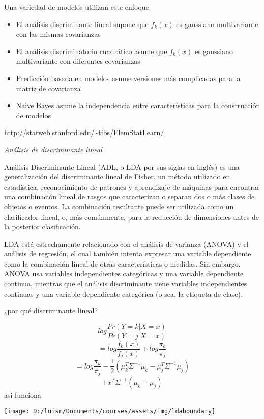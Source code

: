 \documentclass[
]{article}
\providecommand{\tightlist}{%
  \setlength{\itemsep}{0pt}\setlength{\parskip}{0pt}}
\begin{document}
Una variedad de modelos utilizan este enfoque

\begin{itemize}
\tightlist
\item
  El análisis discriminante lineal supone que \(f_k (x)\) es gaussiano
  multivariante con las mismas covarianzas
\item
  El análisis discriminatorio cuadrático asume que \(f_k (x)\) es
  gaussiano multivariante con diferentes covarianzas
\item
  \href{http://www.stat.washington.edu/mclust/}{Predicción basada en
  modelos} asume versiones más complicadas para la matriz de covarianza
\item
  Naive Bayes asume la independencia entre características para la
  construcción de modelos
\end{itemize}

\url{http://statweb.stanford.edu/~tibs/ElemStatLearn/}

\emph{Análisis de discriminante lineal}

Análisis Discriminante Lineal (ADL, o LDA por sus siglas en inglés) es
una generalización del discriminante lineal de Fisher, un método
utilizado en estadística, reconocimiento de patrones y aprendizaje de
máquinas para encontrar una combinación lineal de rasgos que
caracterizan o separan dos o más clases de objetos o eventos. La
combinación resultante puede ser utilizada como un clasificador lineal,
o, más comúnmente, para la reducción de dimensiones antes de la
posterior clasificación.

LDA está estrechamente relacionado con el análisis de varianza (ANOVA) y
el análisis de regresión, el cual también intenta expresar una variable
dependiente como la combinación lineal de otras características o
medidas. Sin embargo, ANOVA usa variables independientes categóricas y
una variable dependiente continua, mientras que el análisis
discriminante tiene variables independientes continuas y una variable
dependiente categórica (o sea, la etiqueta de clase).

¿por qué discriminante lineal?

\[log \frac{Pr(Y = k | X=x)}{Pr(Y = j | X=x)}\]
\[ = log \frac{f_k(x)}{f_j(x)} + log \frac{\pi_k}{\pi_j}\]
\[ = log \frac{\pi_k}{\pi_j} - \frac{1}{2}(\mu_k^T \Sigma^{-1}\mu_k - \mu_j^T \Sigma^{-1}\mu_j)\]
\[ + x^T \Sigma^{-1} (\mu_k - \mu_j)\] asi funciona

\begin{center}\texttt{[image: D:/luism/Documents/courses/assets/img/ldaboundary]} \end{center}
\end{document}
